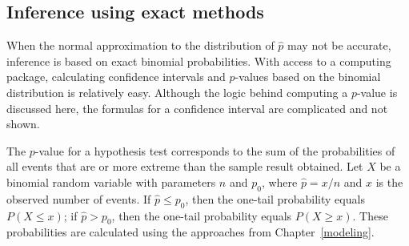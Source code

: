 \subsection{Inference using exact methods}

When the normal approximation to the distribution of $\hat{p}$ may not be accurate, inference is based on exact binomial probabilities. With access to a computing package, calculating confidence intervals and $p$-values based on the binomial distribution is relatively easy. Although the logic behind computing a $p$-value is discussed here, the formulas for a confidence interval are complicated and not shown.

The $p$-value for a hypothesis test corresponds to the sum of the probabilities of all events that are or more extreme than the sample result obtained. Let $X$ be a binomial random variable with parameters $n$ and $p_0$, where $\hat{p} = x/n$ and $x$ is the observed number of events. If $\hat{p} \leq p_0$, then the one-tail probability equals $P(X \leq x)$; if $\hat{p} > p_0$, then the one-tail probability equals $P(X \geq x)$. These probabilities are calculated using the approaches from Chapter~\ref{modeling}.

